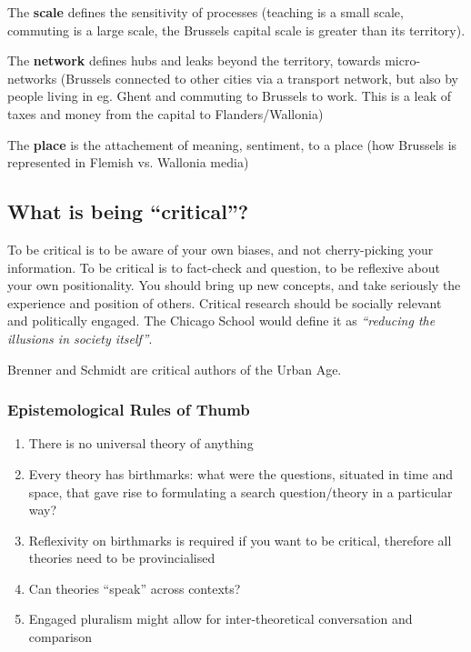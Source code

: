 \documentclass{article}
\begin{document}
The \textbf{scale} defines the sensitivity of processes (teaching is a small scale, commuting is a large scale, the Brussels capital scale is greater than its territory). 

The \textbf{network} defines hubs and leaks beyond the territory, towards micro-networks (Brussels connected to other cities via a transport network, but also by people living in eg. Ghent and commuting to Brussels to work. This is a leak of taxes and money from the capital to Flanders/Wallonia)

The \textbf{place} is the attachement of meaning, sentiment, to a place (how Brussels is represented in Flemish vs. Wallonia media)

\subsection{What is being ``critical''?}

To be critical is to be aware of your own biases, and not cherry-picking your information. To be critical is to fact-check and question, to be reflexive about your own positionality. You should bring up new concepts, and take seriously the experience and position of others. Critical research should be socially relevant and politically engaged. The Chicago School would define it as \textit {``reducing the illusions in society itself''}.

Brenner and Schmidt are critical authors of the Urban Age.

\subsubsection{Epistemological Rules of Thumb}

\begin{enumerate}
  \item There is no universal theory of anything
  \item Every theory has birthmarks: what were the questions, situated in time and space, that gave rise to formulating a search question/theory in a particular way?
  \item Reflexivity on birthmarks is required if you want to be critical, therefore all theories need to be provincialised
  \item Can theories ``speak'' across contexts?
  \item Engaged pluralism might allow for inter-theoretical conversation and comparison
\end{enumerate}
\end{document}
